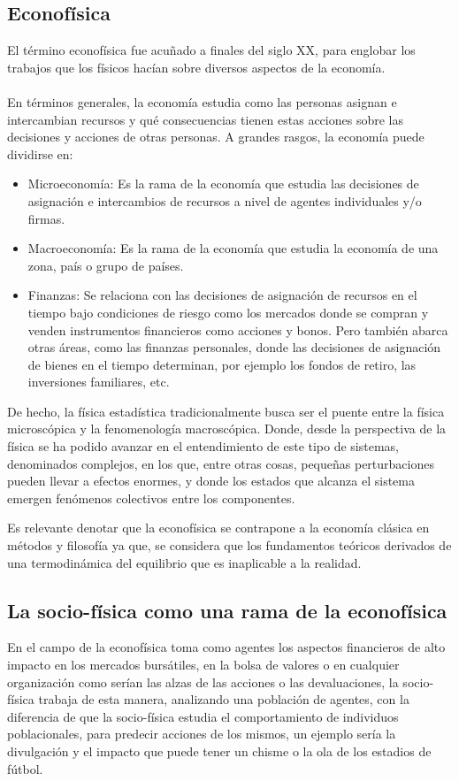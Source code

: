 \subsection*{Econofísica}
El término econofísica fue acuñado a finales del siglo XX, para englobar los trabajos que los físicos hacían sobre diversos aspectos de la economía.
\\
\\
En términos generales, la economía estudia como las personas asignan e intercambian recursos y qué consecuencias tienen estas acciones sobre las decisiones y acciones de otras personas. A grandes rasgos, la economía puede dividirse en:

\begin{itemize}
    \item Microeconomía: Es la rama de la economía que estudia las decisiones de asignación e intercambios de recursos a nivel de agentes individuales y/o firmas.
    \item Macroeconomía: Es la rama de la economía que estudia la economía de una zona, país o grupo de países.
    \item Finanzas: Se relaciona con las decisiones de asignación de recursos en el tiempo bajo condiciones de riesgo como los mercados donde se compran y venden instrumentos financieros como acciones y bonos. Pero también abarca otras áreas, como las finanzas personales, donde las decisiones de asignación de bienes en el tiempo determinan, por ejemplo los fondos de retiro, las inversiones familiares, etc.
\end{itemize}

De hecho, la física estadística tradicionalmente busca ser el puente entre la física microscópica y la fenomenología macroscópica. Donde, desde la perspectiva de la física se ha podido avanzar en el entendimiento de este tipo de sistemas, denominados complejos, en los que, entre otras cosas, pequeñas perturbaciones pueden llevar a efectos enormes, y donde los estados que alcanza el sistema emergen fenómenos colectivos entre los componentes. \cite{Rodriguez2021}

Es relevante denotar que la econofísica se contrapone a la economía clásica en métodos y filosofía ya que, se considera que los fundamentos teóricos derivados de una termodinámica del equilibrio que es inaplicable a la realidad.

\subsection*{La socio-física como una rama de la econofísica}
En el campo de la econofísica toma como agentes los aspectos financieros de alto impacto en los mercados bursátiles, en la bolsa de valores o en cualquier organización como serían las alzas de las acciones o las devaluaciones, la socio-física trabaja de esta manera, analizando una población de agentes, con la diferencia de que la socio-física estudia el comportamiento de individuos poblacionales, para predecir acciones de los mismos, un ejemplo sería la divulgación y el impacto que puede tener un chisme o la ola de los estadios de fútbol.
\thispagestyle{empty}	
